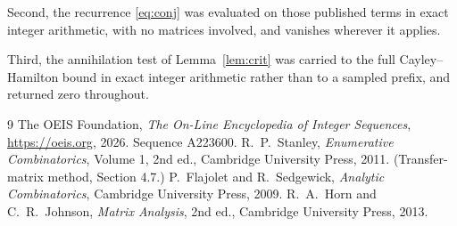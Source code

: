 \documentclass[11pt,a4paper]{article}
\theoremstyle{plain}
\theoremstyle{definition}
\begin{document}
Second, the recurrence \eqref{eq:conj} was evaluated on those published terms in exact
integer arithmetic, with no matrices involved, and vanishes wherever it applies.

Third, the annihilation test of Lemma~\ref{lem:crit} was carried to the full
Cayley--Hamilton bound in exact integer arithmetic rather than to a sampled prefix, and
returned zero throughout.

\begin{thebibliography}{9}
 The OEIS Foundation, \emph{The On-Line Encyclopedia of Integer
Sequences}, \url{https://oeis.org}, 2026. Sequence A223600.
 R.~P.~Stanley, \emph{Enumerative Combinatorics}, Volume 1, 2nd ed.,
Cambridge University Press, 2011. (Transfer-matrix method, Section 4.7.)
 P.~Flajolet and R.~Sedgewick, \emph{Analytic Combinatorics}, Cambridge
University Press, 2009.
 R.~A.~Horn and C.~R.~Johnson, \emph{Matrix Analysis}, 2nd ed., Cambridge
University Press, 2013.
\end{thebibliography}
\end{document}
